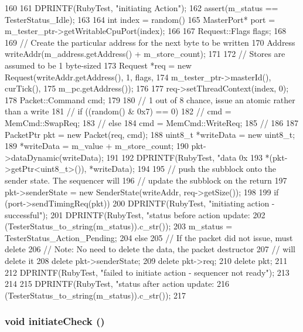 \begin{DoxyCode}
160 {
161     DPRINTF(RubyTest, "initiating Action\n");
162     assert(m_status == TesterStatus_Idle);
163 
164     int index = random() %
165     MasterPort* port = m_tester_ptr->getWritableCpuPort(index);
166 
167     Request::Flags flags;
168 
169     // Create the particular address for the next byte to be written
170     Address writeAddr(m_address.getAddress() + m_store_count);
171 
172     // Stores are assumed to be 1 byte-sized
173     Request *req = new Request(writeAddr.getAddress(), 1, flags,
174             m_tester_ptr->masterId(), curTick(),
175                                m_pc.getAddress());
176 
177     req->setThreadContext(index, 0);
178     Packet::Command cmd;
179 
180     // 1 out of 8 chance, issue an atomic rather than a write
181     // if ((random() & 0x7) == 0) {
182     //     cmd = MemCmd::SwapReq;
183     // } else {
184     cmd = MemCmd::WriteReq;
185     // }
186 
187     PacketPtr pkt = new Packet(req, cmd);
188     uint8_t *writeData = new uint8_t;
189     *writeData = m_value + m_store_count;
190     pkt->dataDynamic(writeData);
191 
192     DPRINTF(RubyTest, "data 0x%
193             *(pkt->getPtr<uint8_t>()), *writeData);
194 
195     // push the subblock onto the sender state.  The sequencer will
196     // update the subblock on the return
197     pkt->senderState = new SenderState(writeAddr, req->getSize());
198 
199     if (port->sendTimingReq(pkt)) {
200         DPRINTF(RubyTest, "initiating action - successful\n");
201         DPRINTF(RubyTest, "status before action update: %
202                 (TesterStatus_to_string(m_status)).c_str());
203         m_status = TesterStatus_Action_Pending;
204     } else {
205         // If the packet did not issue, must delete
206         // Note: No need to delete the data, the packet destructor
207         // will delete it
208         delete pkt->senderState;
209         delete pkt->req;
210         delete pkt;
211 
212         DPRINTF(RubyTest, "failed to initiate action - sequencer not ready\n");
213     }
214 
215     DPRINTF(RubyTest, "status after action update: %
216             (TesterStatus_to_string(m_status)).c_str());
217 }
\end{DoxyCode}
\hypertarget{classCheck_a1196917fe04545fcd2dc71127a41d8a6}{
\subsubsection[{initiateCheck}]{\setlength{\rightskip}{0pt plus 5cm}void initiateCheck ()}}
\label{classCheck_a1196917fe04545fcd2dc71127a41d8a6}



